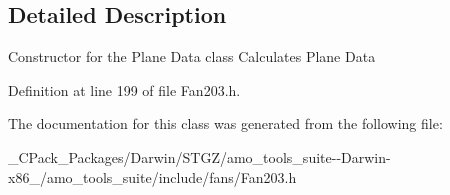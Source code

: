 \subsection{Detailed Description}
Constructor for the Plane Data class Calculates Plane Data 

Definition at line 199 of file Fan203.\+h.



The documentation for this class was generated from the following file\+:\begin{DoxyCompactItemize}
\item 
\+\_\+\+C\+Pack\+\_\+\+Packages/\+Darwin/\+S\+T\+G\+Z/amo\+\_\+tools\+\_\+suite-\/-\/\+Darwin-\/x86\+\_/amo\+\_\+tools\+\_\+suite/include/fans/Fan203.\+h\end{DoxyCompactItemize}

